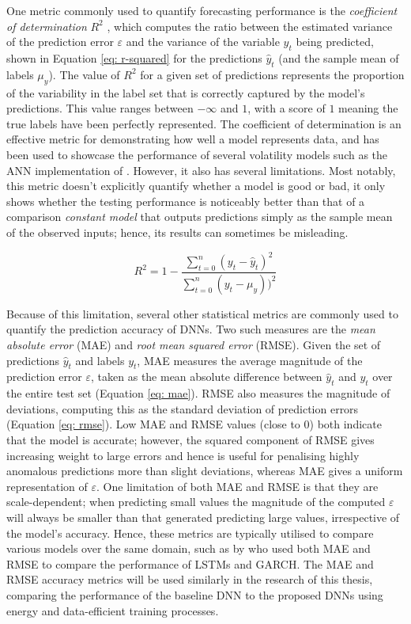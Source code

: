 \documentclass[a4paper, 11pt]{report}
\begin{document}
    One metric commonly used to quantify forecasting performance is the \emph{coefficient of determination} $R^2$ \citep{zhang-2022}, which computes the ratio between the estimated variance of the prediction error $\varepsilon$ and the variance of the variable $y_t$ being predicted, shown in Equation \ref{eq: r-squared} for the predictions $\hat{y}_t$ (and the sample mean of labels $\mu_{y}$). The value of $R^2$ for a given set of predictions represents the proportion of the variability in the label set that is correctly captured by the model's predictions. This value ranges between $- \infty$ and $1$, with a score of $1$ meaning the true labels have been perfectly represented. The coefficient of determination is an effective metric for demonstrating how well a model represents data, and has been used to showcase the performance of several volatility models such as the ANN implementation of \citet{zhang-2022}. However, it also has several limitations. Most notably, this metric doesn't explicitly quantify whether a model is good or bad, it only shows whether the testing performance is noticeably better than that of a comparison \emph{constant model} that outputs predictions simply as the sample mean of the observed inputs; hence, its results can sometimes be misleading.


    \begin{equation}
        \label{eq: r-squared}
        R^2 = 1 - \frac{\sum_{t=0}^n (y_t - \hat{y}_t)^2}{\sum_{t=0}^n (y_t - \mu_{y}))^2}
    \end{equation}


    Because of this limitation, several other statistical metrics are commonly used to quantify the prediction accuracy of DNNs. Two such measures are the \emph{mean absolute error} (MAE) and \emph{root mean squared error} (RMSE). Given the set of predictions $\hat{y}_t$ and labels $y_t$, MAE measures the average magnitude of the prediction error $\varepsilon$, taken as the mean absolute difference between $\hat{y}_t$ and $y_t$ over the entire test set (Equation \ref{eq: mae}). RMSE also measures the magnitude of deviations, computing this as the standard deviation of prediction errors (Equation \ref{eq: rmse}). Low MAE and RMSE values (close to $0$) both indicate that the model is accurate; however, the squared component of RMSE gives increasing weight to large errors and hence is useful for penalising highly anomalous predictions more than slight deviations, whereas MAE gives a uniform representation of $\varepsilon$. One limitation of both MAE and RMSE is that they are scale-dependent; when predicting small values the magnitude of the computed $\varepsilon$ will always be smaller than that generated predicting large values, irrespective of the model's accuracy. Hence, these metrics are typically utilised to compare various models over the same domain, such as by \citet{rodikov-2022} who used both MAE and RMSE to compare the performance of LSTMs and GARCH. The MAE and RMSE accuracy metrics will be used similarly in the research of this thesis, comparing the performance of the baseline DNN to the proposed DNNs using energy and data-efficient training processes. 
\end{document}
